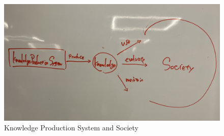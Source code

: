 \documentclass{book}
\begin{document}
\begin{figure}[htb]
    \centering
    \includegraphics[width=\linewidth]{figs/research_process_society.jpg}
    \caption{Knowledge Production System and Society}
    \label{fig:research_process_society}
\end{figure}









\end{document}
